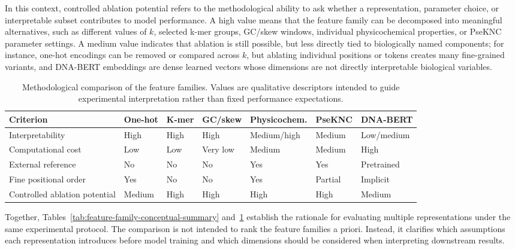 In this context, controlled ablation potential refers to the methodological ability to ask whether a representation, parameter choice, or interpretable subset contributes to model performance. A high value means that the feature family can be decomposed into meaningful alternatives, such as different values of $k$, selected k-mer groups, GC/skew windows, individual physicochemical properties, or PseKNC parameter settings. A medium value indicates that ablation is still possible, but less directly tied to biologically named components; for instance, one-hot encodings can be removed or compared across $k$, but ablating individual positions or tokens creates many fine-grained variants, and DNA-BERT embeddings are dense learned vectors whose dimensions are not directly interpretable biological variables.

\begin{table}[H]
\centering
\scriptsize
\setlength{\tabcolsep}{2pt}
\caption{Methodological comparison of the feature families. Values are qualitative descriptors intended to guide experimental interpretation rather than fixed performance expectations.}
\label{tab:feature-family-methodological-criteria}
\begin{tabular}{p{}p{}p{}p{}p{}p{}p{}}
\toprule
Criterion & One-hot & K-mer & GC/skew & Physicochem. & PseKNC & DNA-BERT \\
\midrule
Interpretability & High & High & High & Medium/high & Medium & Low/medium \\
Computational cost & Low & Low & Very low & Medium & Medium & High \\
External reference & No & No & No & Yes & Yes & Pretrained \\
Fine positional order & Yes & No & No & Yes & Partial & Implicit \\
Controlled ablation potential & Medium & High & High & High & High & Medium \\
\bottomrule
\end{tabular}
\end{table}

Together, Tables~\ref{tab:feature-family-conceptual-summary} and~\ref{tab:feature-family-methodological-criteria} establish the rationale for evaluating multiple representations under the same experimental protocol. The comparison is not intended to rank the feature families a priori. Instead, it clarifies which assumptions each representation introduces before model training and which dimensions should be considered when interpreting downstream results.

